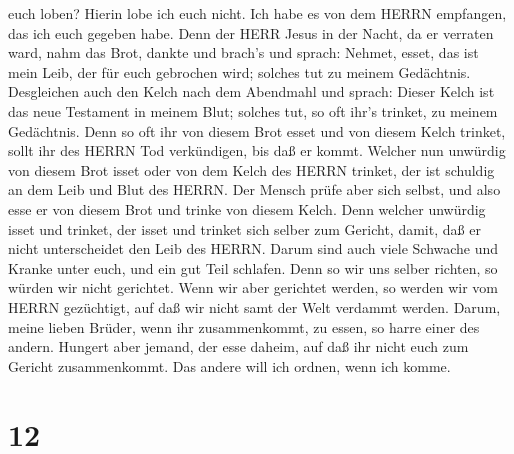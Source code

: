 euch loben? Hierin lobe ich euch nicht.  Ich habe es von
dem HERRN empfangen, das ich euch gegeben habe. Denn der HERR Jesus in
der Nacht, da er verraten ward, nahm das Brot,  dankte und
brach's und sprach: Nehmet, esset, das ist mein Leib, der für euch
gebrochen wird; solches tut zu meinem Gedächtnis. 
Desgleichen auch den Kelch nach dem Abendmahl und sprach: Dieser Kelch
ist das neue Testament in meinem Blut; solches tut, so oft ihr's
trinket, zu meinem Gedächtnis.  Denn so oft ihr von diesem
Brot esset und von diesem Kelch trinket, sollt ihr des HERRN Tod
verkündigen, bis daß er kommt.  Welcher nun unwürdig von
diesem Brot isset oder von dem Kelch des HERRN trinket, der ist schuldig
an dem Leib und Blut des HERRN.  Der Mensch prüfe aber sich
selbst, und also esse er von diesem Brot und trinke von diesem Kelch.
 Denn welcher unwürdig isset und trinket, der isset und
trinket sich selber zum Gericht, damit, daß er nicht unterscheidet den
Leib des HERRN.  Darum sind auch viele Schwache und Kranke
unter euch, und ein gut Teil schlafen.  Denn so wir uns
selber richten, so würden wir nicht gerichtet.  Wenn wir
aber gerichtet werden, so werden wir vom HERRN gezüchtigt, auf daß wir
nicht samt der Welt verdammt werden.  Darum, meine lieben
Brüder, wenn ihr zusammenkommt, zu essen, so harre einer des andern.
 Hungert aber jemand, der esse daheim, auf daß ihr nicht
euch zum Gericht zusammenkommt. Das andere will ich ordnen, wenn ich
komme.

\hypertarget{section-11}{%
\section{12}\label{section-11}}

